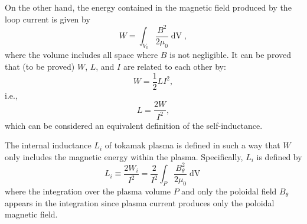 \documentclass{llncs}
\newcommand{\tmop}[1]{\ensuremath{\operatorname{#1}}}
\begin{document}
On the other hand, the energy contained in the magnetic field produced by the
loop current is given by
\begin{equation}
  W = \int_{V_0} \frac{B^2}{2 \mu_0} \tmop{dV},
\end{equation}
where the volume includes all space where $B$ is not negligible. It can be
proved that (to be proved) $W$, $L$, and $I$ are related to each other by:
\begin{equation}
  W = \frac{1}{2} L I^2,
\end{equation}
i.e.,
\begin{equation}
  L = \frac{2 W}{I^2},
\end{equation}
which can be considered an equivalent definition of the self-inductance.

The internal inductance $L_i$ of tokamak plasma is defined in such a way that
$W$ only includes the magnetic energy within the plasma. Specifically, $L_i$
is defined by
\begin{equation}
  \label{22-9-30-1} L_i \equiv \frac{2 W_i}{I^2} = \frac{2}{I^2} \int_P
  \frac{B^2_{\theta}}{2 \mu_0} \tmop{dV}
\end{equation}
where the integration over the plasma volume $P$ and only the poloidal field
$B_{\theta}$ appears in the integration since plasma current produces only the
poloidal magnetic field.
\end{document}
